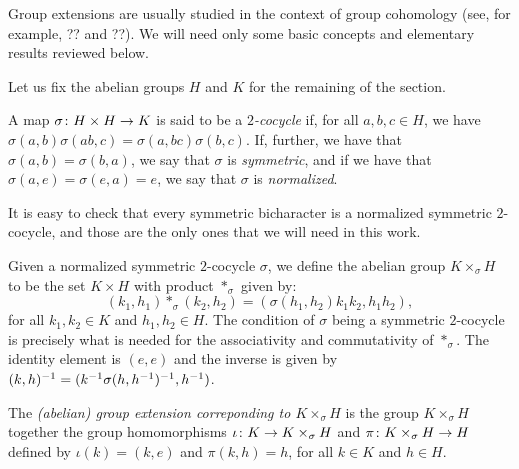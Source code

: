 Group extensions are usually studied in the context of group cohomology (see, for example, ?? and ??).  
We will need only some basic concepts and elementary results reviewed below. 

Let us fix the abelian groups $H$ and $K$ for the remaining of the section.

\begin{defi}
    A map $\sigma\colon H\times H \to K$ is said to be a \emph{$2$-cocycle} if, for all $a,b,c \in H$, we have $\sigma(a,b) \sigma(ab, c) = \sigma(a, bc) \sigma(b,c)$. 
    If, further, we have that $\sigma(a,b) = \sigma(b,a)$, we say that $\sigma$ is \emph{symmetric}, and if we have that $\sigma(a, e) = \sigma(e, a) = e$, we say that $\sigma$ is \emph{normalized}. 
\end{defi}

It is easy to check that every symmetric bicharacter is a normalized symmetric $2$-cocycle, and those are the only ones that we will need in this work. 

Given a normalized symmetric $2$-cocycle $\sigma$, we define the abelian group $K \times_\sigma H$ to be the set $K\times H$ with product $*_\sigma$ given by:
\[
    (k_1, h_1)*_\sigma(k_2, h_2) = (\sigma(h_1, h_2) k_1 k_2, h_1 h_2),
\]
for all $k_1, k_2 \in K$ and $h_1, h_2 \in H$. 
The condition of $\sigma$ being a symmetric $2$-cocycle is precisely what is needed for the associativity and commutativity of $*_\sigma$. 
The identity element is $(e, e)$ and the inverse is given by $(k, h)^{-1} = (k^{-1} \sigma(h,h^{-1})^{-1}, h^{-1})$.
    
\begin{defi}
    The \emph{(abelian) group extension correponding to $K \times_\sigma H$} is the group $K \times_\sigma H$ together the group homomorphisms $\iota \colon K \to K \times_\sigma H$ and $\pi \colon K \times_\sigma H \to H$ defined by $\iota (k) = (k , e)$ and $\pi (k, h) = h$, for all $k\in K$ and $h\in H$.
\end{defi}


